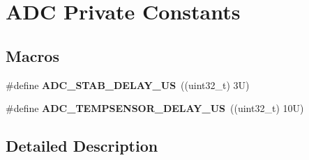 \hypertarget{group___a_d_c___private___constants}{}\section{A\+DC Private Constants}
\label{group___a_d_c___private___constants}
\subsection*{Macros}
\begin{DoxyCompactItemize}
\item 
\mbox{\label{group___a_d_c___private___constants_gad0d1562099d9e378dd1d33b3519cd0c2}} 
\#define {\bfseries A\+D\+C\+\_\+\+S\+T\+A\+B\+\_\+\+D\+E\+L\+A\+Y\+\_\+\+US}~((uint32\+\_\+t) 3\+U)
\item 
\mbox{\label{group___a_d_c___private___constants_gab57114ba262a4b64193617b22da005b0}} 
\#define {\bfseries A\+D\+C\+\_\+\+T\+E\+M\+P\+S\+E\+N\+S\+O\+R\+\_\+\+D\+E\+L\+A\+Y\+\_\+\+US}~((uint32\+\_\+t) 10\+U)
\end{DoxyCompactItemize}


\subsection{Detailed Description}
